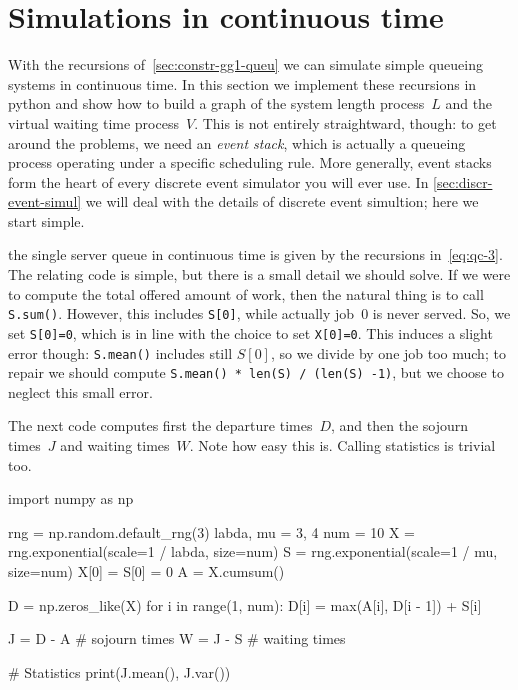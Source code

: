\documentclass[stochastic-or.tex]{subfiles}
\begin{document}
\section{Simulations in continuous time}
\label{sec:simul-cont-time}


With the recursions of~\cref{sec:constr-gg1-queu}  we can simulate simple queueing systems in continuous time.
In this section we implement these recursions in python and show how to build a graph of the system length process~$L$ and the virtual waiting time process~$V$.
This is not entirely straightward, though: to get around the problems, we need an \emph{event stack}, which is actually a queueing process operating under a specific scheduling rule.
More generally, event stacks form the heart of every discrete event simulator you will ever use.
In \cref{sec:discr-event-simul} we will deal with the details of discrete event simultion; here we start simple.

 the single server queue in continuous time is given by the recursions in~\cref{eq:qc-3}.
The relating code is simple, but there is a small detail we should solve.
If we were to compute the total offered amount of work, then the natural thing is to call \texttt{S.sum()}.
However, this includes \texttt{S[0]}, while actually job~$0$ is never served.
So, we set \texttt{S[0]=0}, which is in line with the choice to set \texttt{X[0]=0}.
This induces a slight error though: \texttt{S.mean()} includes still $S[0]$, so we divide by one job too much; to repair we should compute \texttt{S.mean() * len(S) / (len(S) -1)}, but we choose to neglect this small error.

The next code computes first the departure times~$D$, and then the sojourn times~$J$ and waiting times~$W$. Note how easy this is. Calling statistics is trivial too.

\begin{python}
import numpy as np

rng = np.random.default_rng(3)
labda, mu = 3, 4
num = 10
X = rng.exponential(scale=1 / labda, size=num)
S = rng.exponential(scale=1 / mu, size=num)
X[0] = S[0] = 0
A = X.cumsum()

D = np.zeros_like(X)
for i in range(1, num):
    D[i] = max(A[i], D[i - 1]) + S[i]

J = D - A  # sojourn times
W = J - S  # waiting times

# Statistics
print(J.mean(), J.var())
\end{python}
\end{document}
